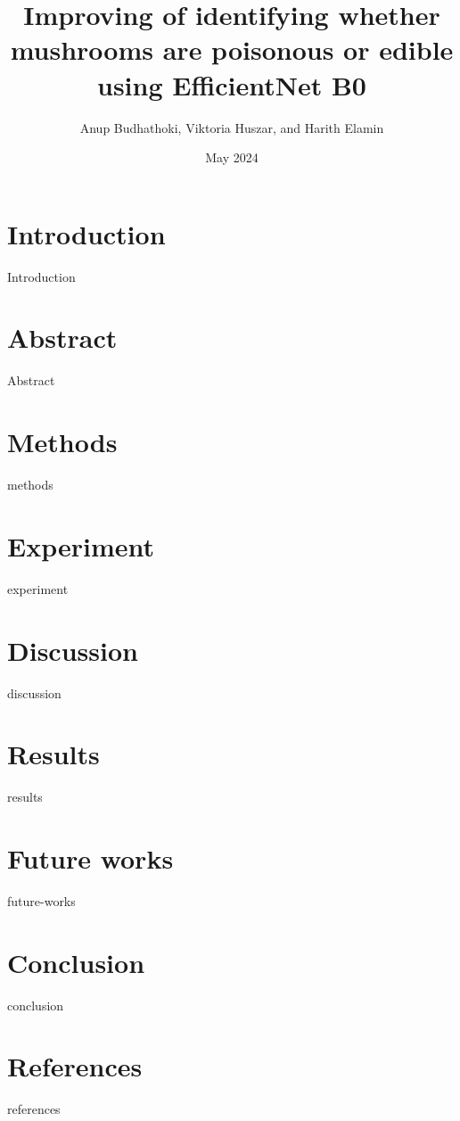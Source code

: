 \documentclass{article}
\title{Improving of identifying whether mushrooms are poisonous or edible using EfficientNet B0}
\author{ Anup Budhathoki, Viktoria Huszar, and Harith Elamin}
\affil{Department of Computer Science, Oslo metropolitan university, Norway}
\date{May 2024}
\begin{document}
\maketitle

\begin{multicols}{2}
\section{Introduction}
{Introduction}    
\section{Abstract}
{Abstract}
\section{Methods}
{methods}
\section{Experiment}
{experiment}
\section{Discussion}
{discussion}
\section{Results}
{results}
\section{Future works}
{future-works}
\section{Conclusion}
{conclusion}
\section{References}
{references}
\end{multicols}
\end{document}
